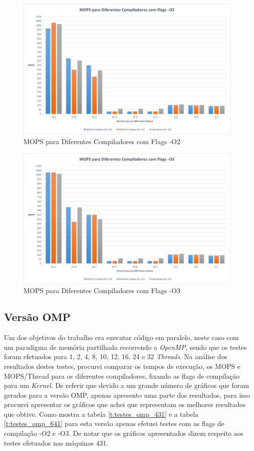 \documentclass[conference,compsoc]{IEEEtran}
\begin{document}
\begin{figure}[h!]
\centering
\includegraphics[scale=0.325]{SER/mops_dif_comp_O2_nodo_431.png}
\caption{MOPS para Diferentes Compiladores com Flags -O2}
\label{fig:mops_dif_comp_O2_431}
\end{figure}

\begin{figure}[h!]
\centering
\includegraphics[scale=0.325]{SER/mops_dif_comp_O3_nodo_431.png}
\caption{MOPS para Diferentes Compiladores com Flags -O3}
\label{fig:mops_dif_comp_O3_431}
\end{figure}

\subsection{Versão OMP}
Um dos objetivos do trabalho era executar código em paralelo, neste caso com um paradigma de memória partilhada recorrendo a \textit{OpenMP}, sendo que os testes foram efetuados para 1, 2, 4, 8, 10, 12, 16, 24 e 32 \textit{Threads}. Na análise dos resultados destes testes, procurei comparar os tempos de execução, os MOPS e MOPS/Thread para os diferentes compiladores, fixando as flags de compilação para um \textit{Kernel}. De referir que devido a um grande número de gráficos que foram gerados para a versão OMP, apenas apresento uma parte dos resultados, para isso procurei apresentar os gráficos que achei que representam os melhores resultados que obtive. Como mostra a tabela \ref{t:testes_omp_431} e a tabela \ref{t:testes_omp_641} para esta versão apenas efetuei testes com as flags de compilação -O2 e -O3. De notar que os gráficos apresentados dizem respeito aos testes efetuados nas máquinas 431.
\end{document}
